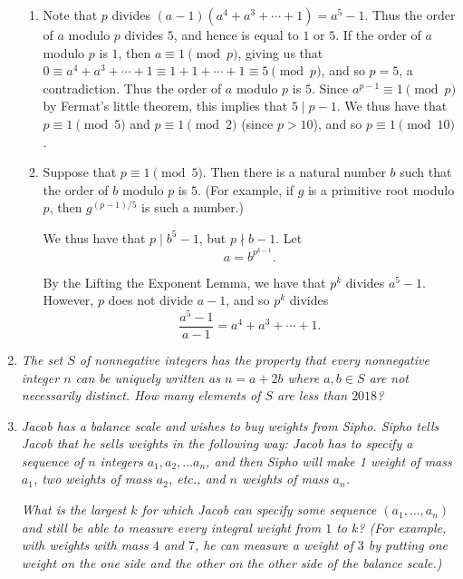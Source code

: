 \documentclass{article}
\begin{document}
\begin{enumerate}[1.]
\begin{enumerate}

\item Note that $p$ divides $(a - 1)(a^4 + a^3 + \cdots + 1) = a^5 - 1$. Thus the order of $a$ modulo $p$ divides $5$, and hence is equal to $1$ or $5$. If the order of $a$ modulo $p$ is $1$, then $a \equiv 1 \pmod p$, giving us that $0 \equiv a^4 + a^3 + \cdots + 1 \equiv 1 + 1 + \cdots + 1 \equiv 5 \pmod p$, and so $p = 5$, a contradiction. Thus the order of $a$ modulo $p$ is $5$. Since $a^{p - 1} \equiv 1 \pmod p$ by Fermat's little theorem, this implies that $5 \mid p - 1$. We thus have that $p \equiv 1 \pmod 5$ and $p \equiv 1 \pmod 2$ (since $p > 10$), and so $p \equiv 1 \pmod{10}$.

\item Suppose that $p \equiv 1 \pmod 5$. Then there is a natural number $b$ such that the order of $b$ modulo $p$ is $5$. (For example, if $g$ is a primitive root modulo $p$, then $g^{(p - 1)/5}$ is such a number.)

We thus have that $p \mid b^5 - 1$, but $p \nmid b - 1$. Let
\[
	a = b^{p^{k - 1}}.
\]

By the Lifting the Exponent Lemma, we have that $p^k$ divides $a^5 - 1$. However, $p$ does not divide $a - 1$, and so $p^k$ divides
\[
	\frac{a^5 - 1}{a - 1} = a^4 + a^3 + \cdots + 1.
\]

\end{enumerate}


\vspace{6pt}
\item %
\textit{The set $S$ of nonnegative integers has the property that every nonnegative integer $n$ can be uniquely written as $n = a+2b$ where $a,b \in S$ are not necessarily distinct. How many elements of $S$ are less than $2018$?
}


\vspace{6pt}
\item %
\textit{Jacob has a balance scale and wishes to buy weights from Sipho. Sipho tells Jacob that he sells weights in the following way: Jacob has to specify a sequence of $n$ integers $a_1, a_2, \dotsc a_n$, and then Sipho will make 1 weight of mass $a_1$, two weights of mass $a_2$, etc., and $n$ weights of mass $a_n$.}

\textit{What is the largest $k$ for which Jacob can specify some sequence $(a_1, \dotsc, a_n)$ and still be able to measure every integral weight from $1$ to $k$? (For example, with weights with mass $4$ and $7$, he can measure a weight of $3$ by putting one weight on the one side and the other on the other side of the balance scale.)}



\end{enumerate}
\end{document}
